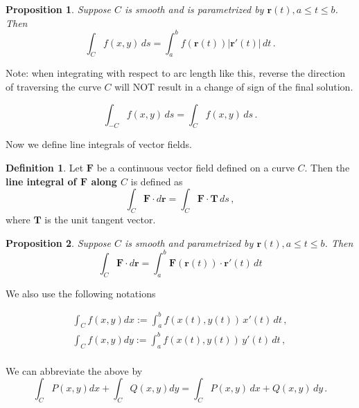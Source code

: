 \documentclass[
]{article}
\newtheorem{proposition}{Proposition}[section]
\theoremstyle{definition}
\newtheorem{definition}{Definition}[section]
\theoremstyle{definition}
\theoremstyle{definition}
\theoremstyle{definition}
\theoremstyle{remark}
\begin{document}
\begin{proposition}
Suppose \(C\) is smooth and is parametrized by \(\mathbf{r}(t), a\leq t \leq b\). Then
\begin{equation*}
    \int_C f(x,y) \, ds = \int_a^b f(\mathbf{r}(t)) |\mathbf{r}'(t)| \, dt \,.
\end{equation*}
\end{proposition}

Note: when integrating with respect to arc length like this, reverse the direction of traversing the curve \(C\) will NOT result
in a change of sign of the final solution.

\begin{equation*}
    \int_{-C} f(x,y) \, ds =  \int_C f(x,y) \, ds \,.
\end{equation*}

Now we define line integrals of vector fields.

\begin{definition}
Let \(\mathbf{F}\) be a continuous vector field defined
on a curve \(C\).
Then the \textbf{line integral of \(\mathbf{F}\) along \(C\)} is defined as
\begin{equation*}
    \int_C \mathbf{F} \cdot d \mathbf{r} 
    = \int_C \mathbf{F}\cdot \mathbf{T} \, ds \,,
\end{equation*}
where \(\mathbf{T}\) is the unit tangent vector.
\end{definition}

\begin{proposition}
Suppose \(C\) is smooth and
parametrized by \(\mathbf{r}(t), a \leq t \leq b\).
Then
\begin{equation*}
    \int_C \mathbf{F} \cdot d \mathbf{r} 
    = \int_a^b \mathbf{F}(\mathbf{r}(t)) \cdot \mathbf{r}'(t) \, dt
\end{equation*}
\end{proposition}

We also use the following notations

\begin{align*}
\int_C f(x,y) dx := \int_a^b f(x(t), y(t) ) \, x'(t) \, dt \,, \\
\int_C f(x,y) dy := \int_a^b f(x(t), y(t) ) \, y'(t) \, dt \,, \\
\end{align*}

We can abbreviate the above by
\begin{equation*}
\int_C P(x,y) dx +
\int_C Q(x,y) dy 
= \int_C P(x,y) \, dx + Q(x,y) \, dy \,.
\end{equation*}
\end{document}
